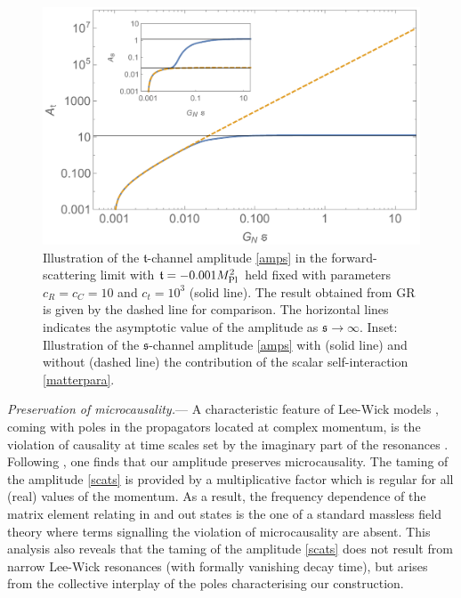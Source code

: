 \documentclass[aps,prl,reprint,twocolumn,superscriptaddress,longbibliography,nofootinbib,floatfix,showpacs]{revtex4-1}
\newcommand{\GR}{{\small GR}}
\newcommand{\mans}{\ensuremath{\mathfrak{s}}}
\newcommand{\mant}{\ensuremath{\mathfrak{t}}}
\begin{document}
%
\begin{figure}
	\includegraphics[width=\columnwidth]{asa2}
	\caption{Illustration of the $\mant$-channel amplitude \eqref{amps} in the forward-scattering limit with $\mant = -0.001 M_{\rm Pl}^2$ held fixed with parameters $c_R = c_C = 10$  and $c_t = 10^3$  (solid line). The result obtained from \GR{} is given by the dashed line for comparison. The horizontal lines indicates the asymptotic value of the amplitude as $\mans \rightarrow \infty$. Inset: Illustration of the $\mans$-channel amplitude \eqref{amps} with (solid line) and without (dashed line) the contribution of the scalar self-interaction \eqref{matterpara}.}
	\label{fig:forwardamplitude}
\end{figure}
%

\textit{Preservation of microcausality.}---
A characteristic feature of Lee-Wick models \cite{Lee:1969fy, Lee:1970iw}, coming with poles in the propagators located at complex momentum, is the violation of causality at time scales set by the imaginary part of the resonances \cite{Grinstein:2008bg, Anselmi:2018tmf, Donoghue:2019ecz}.
Following \cite{Grinstein:2008bg}, one finds that our amplitude preserves microcausality.
The taming of the amplitude \eqref{scats} is provided by a multiplicative factor which is regular for all (real) values of the momentum. As a result, the  frequency dependence of the matrix element relating in and out states is the one of a standard massless field theory where terms signalling the violation of microcausality are absent.
This analysis also reveals that the taming of the amplitude \eqref{scats} does not result from narrow Lee-Wick resonances (with formally vanishing decay time), but arises from the collective interplay of the poles characterising our construction.
\end{document}
